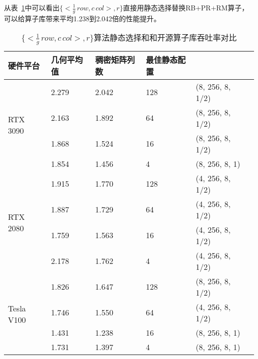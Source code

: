 从表~\ref{tab:sta-ori-rb}中可以看出$\{<\frac{1}{g}\,row , c\,col>,r\}$直接用静态选择替换RB+PR+RM算子，可以给算子库带来平均1.238到2.042倍的性能提升。
\begin{table}
  \centering
  \caption{$\{<\frac{1}{g}\,row , c\,col>,r\}$算法静态选择和和开源算子库吞吐率对比}
  \begin{tabular}{llllll}
  \toprule
  硬件平台 & 几何平均值  & 稠密矩阵列数 & 最佳静态配置 \\
  \midrule
  \multirow{4}{*}{RTX 3090}& 2.279 & 2.042  & 128 & (8, 256, 8, 1/2)\\
                           & 2.163 & 1.892  & 64 & (8, 256, 8, 1/2)\\
                           & 1.868 & 1.524  & 16 & (8, 256, 8, 1/2)\\
                           & 1.854 & 1.456  & 4 & (8, 256, 8, 1)\\
  \hline
  \multirow{4}{*}{RTX 2080}& 1.915 & 1.770  & 128 & (4, 256, 8, 1/2)\\
                          & 1.887 & 1.729   & 64 & (4, 256, 8, 1/2)\\
                          & 1.759 & 1.563  & 16& (4, 256, 8, 1/2)\\
                          & 2.178 & 1.762   & 4 & (4, 256, 8, 1/2)\\
  \hline
  \multirow{4}{*}{Tesla V100}& 1.826 & 1.647  & 128 & (8, 256, 8, 1/2)\\
                          & 1.746 & 1.550   & 64 & (4, 256, 8, 1/2)\\
                          & 1.431 & 1.238  & 16 & (8, 256, 8, 1)\\
                          & 1.731 & 1.397  & 4 & (8, 256, 8, 1)\\
  \bottomrule
  \end{tabular}
  \label{tab:sta-ori-rb}
\end{table}

